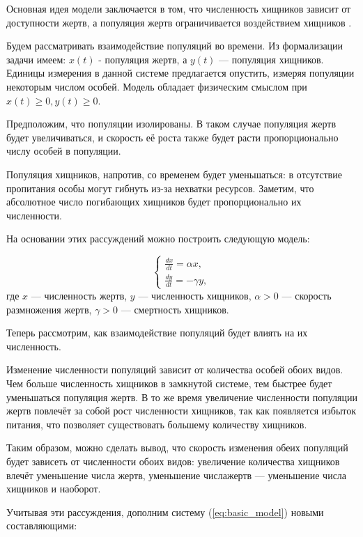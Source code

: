 Основная идея модели заключается в том, что численность хищников зависит от доступности жертв, а популяция жертв ограничивается воздействием хищников \cite{bratush2010}.

Будем рассматривать взаимодействие популяций во времени. 
Из формализации задачи имеем: $x(t)$ - популяция жертв, а $y(t)$ — популяция хищников. 
Единицы измерения в данной системе предлагается опустить, измеряя популяции некоторым числом особей. 
Модель обладает физическим смыслом при $x(t) \ge 0, y(t) \ge 0$.

Предположим, что популяции изолированы. 
В таком случае популяция жертв будет увеличиваться, и скорость её роста также будет расти пропорционально числу особей в популяции.

Популяция хищников, напротив, со временем будет уменьшаться: в отсутствие пропитания особы могут гибнуть из-за нехватки ресурсов. 
Заметим, что абсолютное число погибающих хищников будет пропорционально их численности.

На основании этих рассуждений можно построить следующую модель:

\begin{equation}
	\begin{cases}
		\frac{dx}{dt} = \alpha x, \\
		\frac{dy}{dt} = -\gamma y,
	\end{cases}
	\label{eq:basic_model}
\end{equation}
где $x$ — численность жертв, $y$ — численность хищников, $\alpha > 0$ — скорость размножения жертв, $\gamma > 0$ — смертность хищников.

Теперь рассмотрим, как взаимодействие популяций будет влиять на их численность.

Изменение численности популяций зависит от количества особей обоих видов. 
Чем больше численность хищников в замкнутой системе, тем быстрее будет уменьшаться популяция жертв. 
В то же время увеличение численности популяции жертв повлечёт за собой рост численности хищников, так как появляется избыток питания, что позволяет существовать большему количеству хищников.

Таким образом, можно сделать вывод, что скорость изменения обеих популяций будет зависеть от численности обоих видов: увеличение количества хищников влечёт уменьшение числа жертв, уменьшение числажертв — уменьшение числа хищников и наоборот.

Учитывая эти рассуждения, дополним систему (\ref{eq:basic_model}) новыми составляющими:

